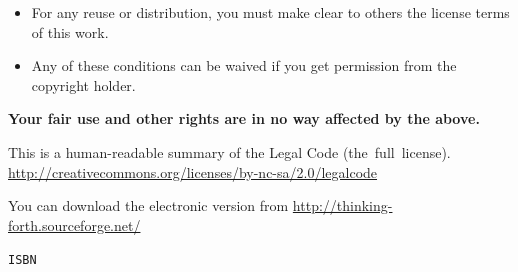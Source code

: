 \begin{itemize}
\item For any reuse or distribution, you must make clear to others the
license terms of this work.
 
\item Any of these conditions can be waived if you get permission from the copyright holder.
\end{itemize}

\begin{center}
\textbf{Your fair use and other rights are in no way affected by the above.}

\medskip
This is a human-readable summary of the Legal Code
{\def\UrlLeft#1\UrlRight{(the\ full\ license).}
\url{http://creativecommons.org/licenses/by-nc-sa/2.0/legalcode}}

\bigskip
\vfill
You can download the electronic version from
\url{http://thinking-forth.sourceforge.net/}

\ifisbn
\bigskip

{\tt ISBN \isbn}
\fi

\end{center}
